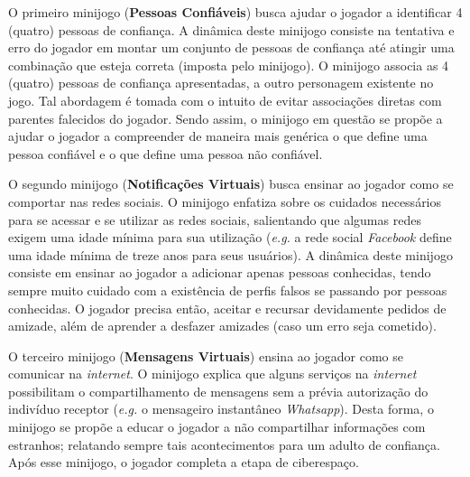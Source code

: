 \begin{figure}
  \vspace{-1.0cm}
\end{figure}

O primeiro minijogo (\textbf{Pessoas Confiáveis}) busca ajudar o jogador a identificar 4 (quatro) pessoas de confiança. A dinâmica deste minijogo consiste na tentativa e erro do jogador em montar um conjunto de pessoas de confiança até atingir uma combinação que esteja correta (imposta pelo minijogo). O minijogo associa as 4 (quatro) pessoas de confiança apresentadas, a outro personagem existente no jogo. Tal abordagem é tomada com o intuito de evitar associações diretas com parentes falecidos do jogador. Sendo assim, o minijogo em questão se propõe a ajudar o jogador a compreender de maneira mais genérica o que define uma pessoa confiável e o que define uma pessoa não confiável. 


O segundo minijogo (\textbf{Notificações Virtuais}) busca ensinar ao jogador como se comportar nas redes sociais. O minijogo enfatiza sobre os cuidados necessários para se acessar e se utilizar as redes sociais, salientando que algumas redes exigem uma idade mínima para sua utilização (\textit{e.g.} a rede social \textit{Facebook} define uma idade mínima de treze anos para seus usuários). A dinâmica deste minijogo consiste em ensinar ao jogador a adicionar apenas pessoas conhecidas, tendo sempre muito cuidado com a existência de perfis falsos se passando por pessoas conhecidas. O jogador precisa então, aceitar e recursar devidamente pedidos de amizade, além de aprender a desfazer amizades (caso um erro seja cometido). 

O terceiro minijogo (\textbf{Mensagens Virtuais}) ensina ao jogador como se comunicar na \textit{internet}. O minijogo explica que alguns serviços na \textit{internet} possibilitam o compartilhamento de mensagens sem a prévia autorização do indivíduo receptor (\textit{e.g.} o mensageiro instantâneo \textit{Whatsapp}). Desta forma, o minijogo se propõe a educar o jogador a não compartilhar informações com estranhos; relatando sempre tais acontecimentos para um adulto de confiança. Após esse minijogo, o jogador completa a etapa de ciberespaço. 

